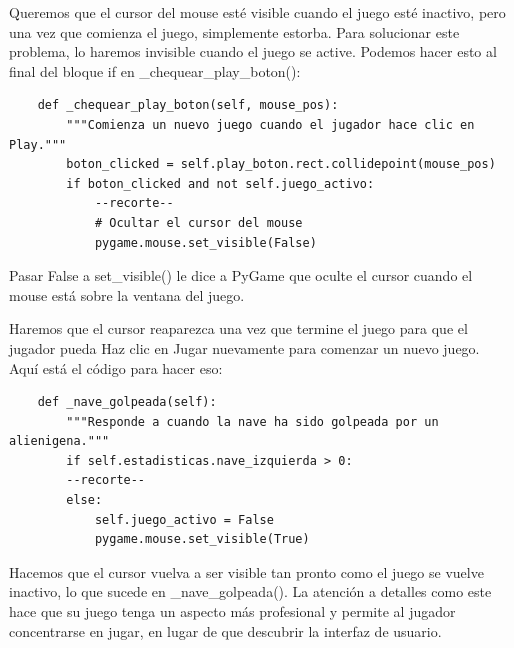 Queremos que el cursor del mouse esté visible cuando el juego esté inactivo, pero una vez que comienza el juego, simplemente estorba. Para solucionar este problema, lo haremos invisible cuando el juego se active. Podemos hacer esto al final del bloque {\ttfamily if}  en {\ttfamily \_chequear\_play\_boton()}:


\hspace{-2.4cm}{\ttfamily \scriptsize invasión}

\vspace{-0.2cm}
\hspace{-2.1cm}{\ttfamily \scriptsize \_alien.py}\vspace{-0.84cm}
\begin{lstlisting}
    def _chequear_play_boton(self, mouse_pos):
        """Comienza un nuevo juego cuando el jugador hace clic en Play."""
        boton_clicked = self.play_boton.rect.collidepoint(mouse_pos)
        if boton_clicked and not self.juego_activo: 
            --recorte--
            # Ocultar el cursor del mouse
            pygame.mouse.set_visible(False)
\end{lstlisting}


Pasar {\ttfamily False} a  {\ttfamily set\_visible()} le dice a PyGame que oculte el cursor cuando
el mouse está sobre la ventana del juego.

Haremos que el cursor reaparezca una vez que termine el juego para que el jugador pueda
Haz clic en Jugar nuevamente para comenzar un nuevo juego. Aquí está el código para hacer eso:

\hspace{-2.4cm}{\ttfamily \scriptsize invasión}

\vspace{-0.2cm}
\hspace{-2.1cm}{\ttfamily \scriptsize \_alien.py}\vspace{-0.84cm}
\begin{lstlisting}
    def _nave_golpeada(self):
        """Responde a cuando la nave ha sido golpeada por un alienigena."""
        if self.estadisticas.nave_izquierda > 0:
        --recorte--
        else:
            self.juego_activo = False
            pygame.mouse.set_visible(True)
\end{lstlisting}

Hacemos que el cursor vuelva a ser visible tan pronto como el juego se vuelve inactivo,
lo que sucede en {\ttfamily \_nave\_golpeada()}. La atención a detalles como este hace que su juego tenga un 
aspecto más profesional y permite al jugador concentrarse en jugar, en lugar de que descubrir la interfaz de usuario.

